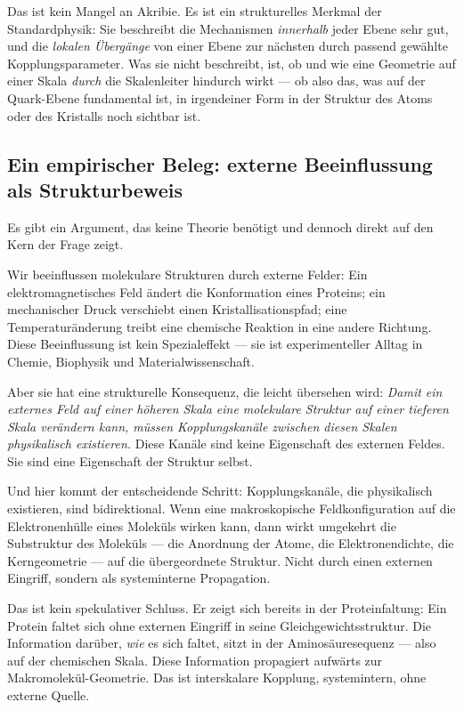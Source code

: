 Das ist kein Mangel an Akribie. Es ist ein strukturelles Merkmal der
Standardphysik: Sie beschreibt die Mechanismen \emph{innerhalb} jeder
Ebene sehr gut, und die \emph{lokalen Übergänge} von einer Ebene zur
nächsten durch passend gewählte Kopplungsparameter. Was sie nicht
beschreibt, ist, ob und wie eine Geometrie auf einer Skala
\emph{durch} die Skalenleiter hindurch wirkt --- ob also das, was auf
der Quark-Ebene fundamental ist, in irgendeiner Form in der Struktur
des Atoms oder des Kristalls noch sichtbar ist.

\subsection*{Ein empirischer Beleg: externe Beeinflussung als Strukturbeweis}

Es gibt ein Argument, das keine Theorie benötigt und dennoch direkt auf
den Kern der Frage zeigt.

Wir beeinflussen molekulare Strukturen durch externe Felder: Ein
elektromagnetisches Feld ändert die Konformation eines Proteins; ein
mechanischer Druck verschiebt einen Kristallisationspfad; eine
Temperaturänderung treibt eine chemische Reaktion in eine andere
Richtung. Diese Beeinflussung ist kein Spezialeffekt --- sie ist
experimenteller Alltag in Chemie, Biophysik und Materialwissenschaft.

Aber sie hat eine strukturelle Konsequenz, die leicht übersehen wird:
\emph{Damit ein externes Feld auf einer höheren Skala eine molekulare
Struktur auf einer tieferen Skala verändern kann, müssen
Kopplungskanäle zwischen diesen Skalen physikalisch existieren.}
Diese Kanäle sind keine Eigenschaft des externen Feldes. Sie sind eine
Eigenschaft der Struktur selbst.

Und hier kommt der entscheidende Schritt: Kopplungskanäle, die
physikalisch existieren, sind bidirektional. Wenn eine makroskopische
Feldkonfiguration auf die Elektronenhülle eines Moleküls wirken kann,
dann wirkt umgekehrt die Substruktur des Moleküls --- die Anordnung
der Atome, die Elektronendichte, die Kerngeometrie --- auf die
übergeordnete Struktur. Nicht durch einen externen Eingriff, sondern
als systeminterne Propagation.

Das ist kein spekulativer Schluss. Er zeigt sich bereits in der
Proteinfaltung: Ein Protein faltet sich ohne externen Eingriff in seine
Gleichgewichtsstruktur. Die Information darüber, \emph{wie} es sich
faltet, sitzt in der Aminosäuresequenz --- also auf der chemischen
Skala. Diese Information propagiert aufwärts zur Makromolekül-Geometrie.
Das ist interskalare Kopplung, systemintern, ohne externe Quelle.

